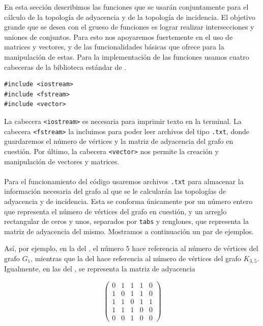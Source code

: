 En esta sección describimos las funciones que se usarán conjuntamente para el cálculo de la topología de adyacencia y de la topología de incidencia. El objetivo grande que se desea con el grueso de funciones es lograr realizar intersecciones y uniones de conjuntos. Para esto nos apoyaremos fuertemente en el uso de matrices y vectores, y de las funcionalidades básicas que ofrece \Cpp{} para la manipulación de estas.
Para la implementación de las funciones usamos cuatro cabeceras de la biblioteca estándar de \Cpp{}.
\begin{lstlisting}[caption={Cabeceras necesarias para el uso de los códigos}, label={cod:encabezado}]
#include <iostream>
#include <fstream>
#include <vector>
\end{lstlisting}
La cabecera \texttt{<iostream>} es necesaria para imprimir texto en la terminal. La cabecera \texttt{<fstream>} la incluimos para poder leer archivos del tipo \texttt{.txt}, donde guardaremos el número de vértices y la matriz de adyacencia del grafo en cuestión. Por último, la cabecera \texttt{<vector>} nos permite la creación y manipulación de vectores y matrices.\\\\
Para el funcionamiento del código usaremos archivos \texttt{.txt} para almacenar la información necesaria del grafo al que se le calcularán las topologías de adyacencia y de incidencia. Esta se conforma únicamente por un número entero que representa el número de vértices del grafo en cuestión, y un arreglo rectangular de ceros y unos, separados por \texttt{tabs} y renglones, que representa la matriz de adyacencia del mismo. Mostramos a continuación un par de ejemplos.


Así, por ejemplo, en la  del , el número $5$ hace referencia al número de vértices del grafo $G_1$, mientras que la  del  hace referencia al número de vértices del grafo $K_{3,5}$. Igualmente, en las  del , se representa la matriz de adyacencia
\begin{ceqn}
\[
\begin{pmatrix}
   0 & 1 & 1 & 1 & 0 \\
   1 & 0 & 1 & 1 & 0 \\
   1 & 1 & 0 & 1 & 1 \\
   1 & 1 & 1 & 0 & 0 \\
   0 & 0 & 1 & 0 & 0
\end{pmatrix}
\]
\end{ceqn}

